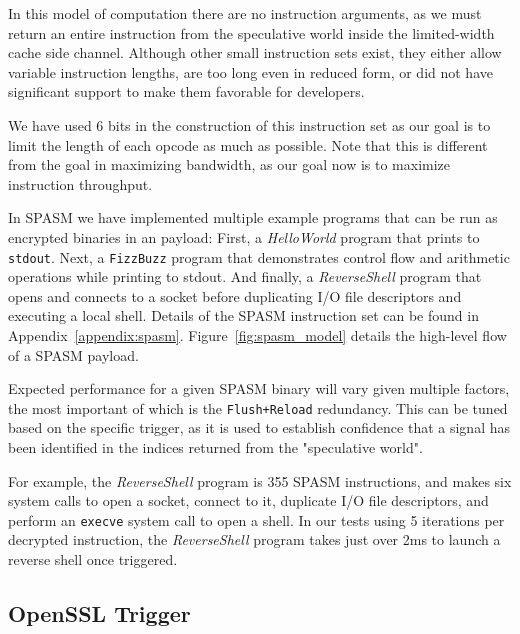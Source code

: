 In this model of computation there are no instruction arguments, as we must
return an entire instruction from the speculative world inside the limited-width
cache side channel. Although other small
instruction sets exist, they either allow variable instruction
lengths, are too long even in reduced form, or did not have significant support
to make them favorable for developers.

We have used 6 bits in the construction of this instruction set as our
goal is to limit the length of each opcode as much as possible. Note that this
is different from the goal in maximizing bandwidth, as our goal now is to
maximize instruction throughput.

In SPASM we have implemented multiple example programs that can be run as
encrypted binaries in an \speculake payload: First, a \textit{HelloWorld}
program that prints to \texttt{stdout}. Next, a \texttt{FizzBuzz} program that
demonstrates control flow and arithmetic operations while printing to stdout.
And finally, a \textit{ReverseShell} program that opens and connects to a socket
before  duplicating I/O file descriptors and executing a local shell. Details of
the SPASM instruction set can be found in Appendix~\ref{appendix:spasm}. Figure~\ref{fig:spasm_model} details the high-level flow of a SPASM payload.

Expected performance for a given SPASM binary will vary given multiple factors,
the most important of which is the \texttt{Flush+Reload} redundancy. This can be
tuned based on the specific trigger, as it is used to establish confidence that
a signal has been identified in the indices returned from the "speculative
world". 


For example, the \textit{ReverseShell} program is 355 SPASM instructions, and
makes six system calls to open a socket,
connect to it, duplicate I/O file descriptors, and perform an \texttt{execve}
system call to open a shell.
In our tests using 5 iterations per decrypted instruction, the
\textit{ReverseShell} program takes just over 2ms to launch a reverse shell
once triggered.


\FigSpasmModel

\subsection{OpenSSL Trigger}
\label{subsec:openssl}

